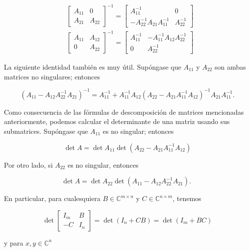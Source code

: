 $$
\begin{aligned}
& {\left[\begin{array}{cc}
A_{11} & 0 \\
A_{21} & A_{22}
\end{array}\right]^{-1}=\left[\begin{array}{cc}
A_{11}^{-1} & 0 \\
-A_{22}^{-1} A_{21} A_{11}^{-1} & A_{22}^{-1}
\end{array}\right]} \\
& {\left[\begin{array}{cc}
A_{11} & A_{12} \\
0 & A_{22}
\end{array}\right]^{-1}=\left[\begin{array}{cc}
A_{11}^{-1} & -A_{11}^{-1} A_{12} A_{22}^{-1} \\
0 & A_{22}^{-1}
\end{array}\right]}
\end{aligned}
$$

La siguiente identidad también es muy útil. Supóngase que $A_{11}$ y $A_{22}$ son ambas matrices no singulares; entonces

$$
\left(A_{11}-A_{12} A_{22}^{-1} A_{21}\right)^{-1}=A_{11}^{-1}+A_{11}^{-1} A_{12}\left(A_{22}-A_{21} A_{11}^{-1} A_{12}\right)^{-1} A_{21} A_{11}^{-1} .
$$

Como consecuencia de las fórmulas de descomposición de matrices mencionadas anteriormente, podemos calcular el determinante de una matriz usando sus submatrices. Supóngase que $A_{11}$ es no singular; entonces

$$
\operatorname{det} A=\operatorname{det} A_{11} \operatorname{det}\left(A_{22}-A_{21} A_{11}^{-1} A_{12}\right)
$$

Por otro lado, si $A_{22}$ es no singular, entonces

$$
\operatorname{det} A=\operatorname{det} A_{22} \operatorname{det}\left(A_{11}-A_{12} A_{22}^{-1} A_{21}\right) \text {. }
$$

En particular, para cualesquiera $B \in \mathbb{C}^{m \times n}$ y $C \in \mathbb{C}^{n \times m}$, tenemos

$$
\operatorname{det}\left[\begin{array}{cc}
I_{m} & B \\
-C & I_{n}
\end{array}\right]=\operatorname{det}\left(I_{n}+C B\right)=\operatorname{det}\left(I_{m}+B C\right)
$$

y para $x, y \in \mathbb{C}^{n}$


